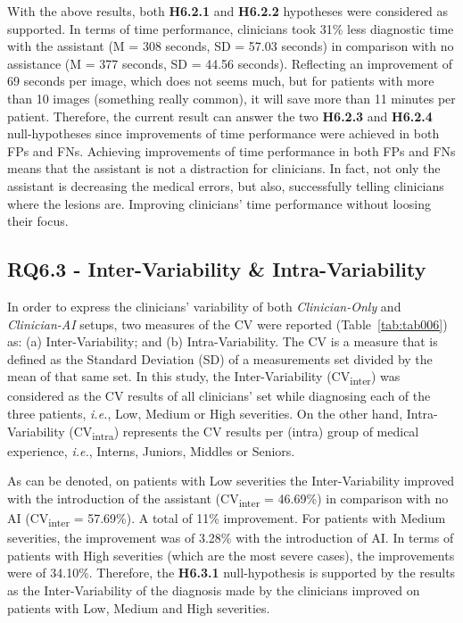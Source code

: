 With the above results, both {\bf H6.2.1} and {\bf H6.2.2} hypotheses were considered as supported.
In terms of time performance, clinicians took 31\% less diagnostic time with the assistant (M = 308 seconds, SD = 57.03 seconds) in comparison with no assistance (M = 377 seconds, SD = 44.56 seconds).
Reflecting an improvement of 69 seconds per image, which does not seems much, but for patients with more than 10 images (something really common), it will save more than 11 minutes per patient.
Therefore, the current result can answer the two {\bf H6.2.3} and {\bf H6.2.4} null-hypotheses since improvements of time performance were achieved in both \acp{FP} and \acp{FN}.
Achieving improvements of time performance in both \acp{FP} and \acp{FN} means that the assistant is not a distraction for clinicians.
In fact, not only the assistant is decreasing the medical errors, but also, successfully telling clinicians where the lesions are.
Improving clinicians' time performance without loosing their focus.

\subsection{RQ6.3 - Inter-Variability \& Intra-Variability}
\label{sec:app002006003}

In order to express the clinicians' variability of both {\it Clinician-Only} and {\it Clinician-AI} setups, two measures of the \acf{CV} were reported (Table~\ref{tab:tab006}) as:
(a) Inter-Variability; and
(b) Intra-Variability.
The \ac{CV} is a measure that is defined as the Standard Deviation (SD) of a measurements set divided by the mean of that same set.
In this study, the Inter-Variability (CV\textsubscript{inter}) was considered as the \ac{CV} results of all clinicians' set while diagnosing each of the three patients, {\it i.e.}, Low, Medium or High severities.
On the other hand, Intra-Variability (CV\textsubscript{intra}) represents the \ac{CV} results per (intra) group of medical experience, {\it i.e.}, Interns, Juniors, Middles or Seniors.



As can be denoted, on patients with Low severities the Inter-Variability improved with the introduction of the assistant (CV\textsubscript{inter} = 46.69\%) in comparison with no \ac{AI} (CV\textsubscript{inter} = 57.69\%).
A total of 11\% improvement.
For patients with Medium severities, the improvement was of 3.28\% with the introduction of \ac{AI}.
In terms of patients with High severities (which are the most severe cases), the improvements were of 34.10\%.
Therefore, the {\bf H6.3.1} null-hypothesis is supported by the results as the Inter-Variability of the diagnosis made by the clinicians improved on patients with Low, Medium and High severities.

